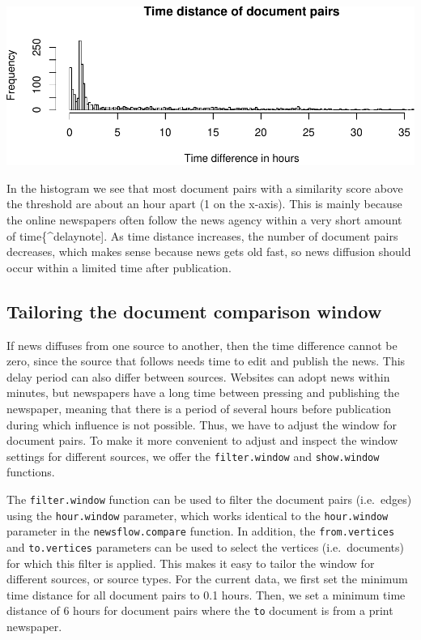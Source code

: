 \documentclass[]{article}
\begin{document}
\includegraphics{vignette_files/figure-latex/unnamed-chunk-11-1.pdf}

In the histogram we see that most document pairs with a similarity score
above the threshold are about an hour apart (1 on the x-axis). This is
mainly because the online newspapers often follow the news agency within
a very short amount of time\{\^{}delaynote{]}. As time distance
increases, the number of document pairs decreases, which makes sense
because news gets old fast, so news diffusion should occur within a
limited time after publication.

\subsection{Tailoring the document comparison
window}\label{tailoring-the-document-comparison-window}

If news diffuses from one source to another, then the time difference
cannot be zero, since the source that follows needs time to edit and
publish the news. This delay period can also differ between sources.
Websites can adopt news within minutes, but newspapers have a long time
between pressing and publishing the newspaper, meaning that there is a
period of several hours before publication during which influence is not
possible. Thus, we have to adjust the window for document pairs. To make
it more convenient to adjust and inspect the window settings for
different sources, we offer the \texttt{filter.window} and
\texttt{show.window} functions.

The \texttt{filter.window} function can be used to filter the document
pairs (i.e.~edges) using the \texttt{hour.window} parameter, which works
identical to the \texttt{hour.window} parameter in the
\texttt{newsflow.compare} function. In addition, the
\texttt{from.vertices} and \texttt{to.vertices} parameters can be used
to select the vertices (i.e.~documents) for which this filter is
applied. This makes it easy to tailor the window for different sources,
or source types. For the current data, we first set the minimum time
distance for all document pairs to 0.1 hours. Then, we set a minimum
time distance of 6 hours for document pairs where the \texttt{to}
document is from a print newspaper.
\end{document}
